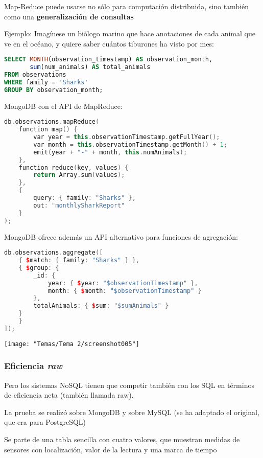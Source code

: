 Map-Reduce puede usarse no sólo para computación distribuida, sino también como una \textbf{generalización de consultas}

Ejemplo: Imagínese un biólogo marino que hace anotaciones de cada animal que ve en el océano, y quiere saber cuántos tiburones ha visto por mes:

\begin{lstlisting}[language=SQL]
SELECT MONTH(observation_timestamp) AS observation_month,
       sum(num_animals) AS total_animals
FROM observations
WHERE family = 'Sharks'
GROUP BY observation_month;
\end{lstlisting}

MongoDB con el API de MapReduce:

\begin{lstlisting}[language=C++]
db.observations.mapReduce(
	function map() {
		var year = this.observationTimestamp.getFullYear();
		var month = this.observationTimestamp.getMonth() + 1;
		emit(year + "-" + month, this.numAnimals);
	},
	function reduce(key, values) {
		return Array.sum(values);
	},
	{
		query: { family: "Sharks" },
		out: "monthlySharkReport"
	}
);
\end{lstlisting}
MongoDB ofrece además un API alternativo para funciones de agregación:
\begin{lstlisting}[language=C++]
db.observations.aggregate([
	{ $match: { family: "Sharks" } },
	{ $group: {
		_id: {
			year: { $year: "$observationTimestamp" },
			month: { $month: "$observationTimestamp" }
		},
		totalAnimals: { $sum: "$sumAnimals" }
	}
	}
]);
\end{lstlisting}
\begin{center}
	\texttt{[image: "Temas/Tema 2/screenshot005"]}
\end{center}
\subsubsection{Eficiencia \textit{raw}}
Pero los sistemas NoSQL tienen que competir también con los SQL en términos de eficiencia neta (también llamada raw).

La prueba se realizó sobre MongoDB y sobre MySQL (se ha adaptado el original, que era para PostgreSQL)

Se parte de una tabla sencilla con cuatro valores, que muestran medidas de sensores con localización, valor de la lectura y una marca de tiempo

